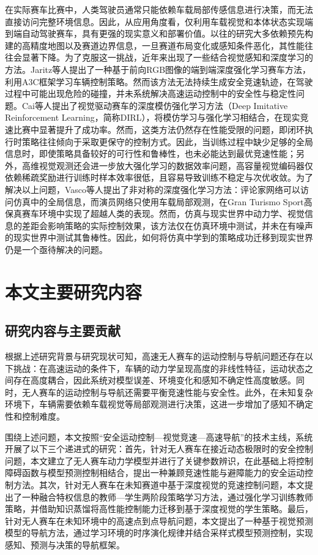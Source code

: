 在实际赛车比赛中，人类驾驶员通常只能依赖车载局部传感信息进行决策，而无法直接访问完整环境信息。因此，从应用角度看，仅利用车载视觉和本体状态实现端到端自动驾驶赛车，具有更强的现实意义和部署价值。以往的研究大多依赖预先构建的高精度地图以及赛道边界信息，一旦赛道布局变化或感知条件恶化，其性能往往会显著下降。为了克服这一挑战，近年来出现了一些结合视觉感知和深度学习的方法。Jaritz等人提出了一种基于前向RGB图像的端到端深度强化学习赛车方法，利用A3C框架学习车辆控制策略\cite{jaritz2018end}。然而该方法无法持续生成安全竞速轨迹，在驾驶过程中可能出现危险的碰撞，并未系统解决高速运动控制中的安全性与稳定性问题。Cai等人提出了视觉驱动赛车的深度模仿强化学习方法（Deep Imitative Reinforcement Learning，简称DIRL），将模仿学习与强化学习相结合，在现实竞速比赛中显著提升了成功率\cite{cai2021vision}。然而，这类方法仍然存在性能受限的问题，即闭环执行时策略往往倾向于采取更保守的控制方式。因此，当训练过程中缺少足够的全局信息时，即使策略具备较好的可行性和鲁棒性，也未必能达到最优竞速性能；另外，高维视觉观测还会进一步放大强化学习的数据效率问题，高容量视觉编码器仅依赖稀疏奖励进行训练时样本效率很低，且容易导致训练不稳定与次优收敛\cite{yarats2021improving}。为了解决以上问题，Vasco等人提出了非对称的深度强化学习方法：评论家网络可以访问仿真中的全局信息，而演员网络只使用车载局部观测，在Gran Turismo Sport高保真赛车环境中实现了超越人类的表现\cite{vasco2024super}。然而，仿真与现实世界中动力学、视觉信息的差距会影响策略的实际控制效果\cite{peng2018sim}，该方法仅在仿真环境中测试，并未在有噪声的现实世界中测试其鲁棒性。因此，如何将仿真中学到的策略成功迁移到现实世界仍是一个亟待解决的问题。
\section{本文主要研究内容}
\subsection{研究内容与主要贡献}
根据上述研究背景与研究现状可知，高速无人赛车的运动控制与导航问题还存在以下挑战：在高速运动的条件下，车辆的动力学呈现高度的非线性特征，运动状态之间存在高度耦合，因此系统对模型误差、环境变化和感知不确定性高度敏感。同时，无人赛车的运动控制与导航还需要平衡竞速性能与安全性。此外，在未知复杂环境下，车辆需要依赖车载视觉等局部观测进行决策，这进一步增加了感知不确定性和控制难度。

围绕上述问题，本文按照“安全运动控制—视觉竞速—高速导航”的技术主线，系统开展了以下三个递进式的研究：首先，针对无人赛车在接近动态极限时的安全控制问题，本文建立了无人赛车动力学模型并进行了关键参数辨识，在此基础上将控制障碍函数与模型预测控制相结合，提出一种兼顾竞速性能与避障能力的安全运动控制方法。其次，针对无人赛车在未知赛道中基于深度视觉的竞速控制问题，本文提出了一种融合特权信息的教师—学生两阶段策略学习方法，通过强化学习训练教师策略，并借助知识蒸馏将高性能控制能力迁移到基于深度视觉的学生策略。最后，针对无人赛车在未知环境中的高速点到点导航问题，本文提出了一种基于视觉预测模型的导航方法，通过学习环境的时序演化规律并结合采样式模型预测控制，实现感知、预测与决策的导航框架。

